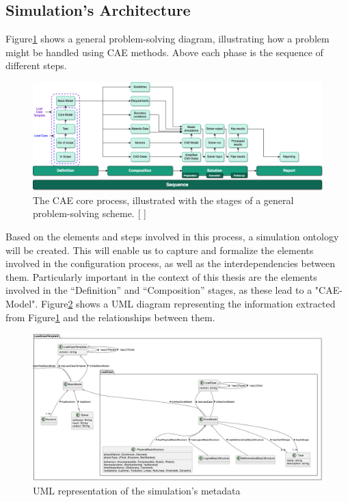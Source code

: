 \subsection{Simulation's Architecture}
Figure\ref{fig:cea-proc} shows a general problem-solving diagram, illustrating how a problem might be handled using CAE methods. Above each phase is the sequence of different steps.\\

\begin{figure}[h]
    \centering
    \includegraphics[width=\textwidth]{images/Concept-cae-process.drawio.png}
    \caption{\label{fig:cea-proc}  The CAE core process, illustrated with the stages of a general problem-solving scheme. [ ]}
\end{figure}

Based on the elements and steps involved in this process, a simulation ontology will be created. This will enable us to capture and formalize the elements involved in the configuration process, as well as the interdependencies between them. Particularly important in the context of this thesis are the elements involved in the “Definition” and “Composition” stages, as these lead to a "CAE-Model". Figure\ref{fig:uml-sim} shows a UML diagram representing the information extracted from Figure\ref{fig:cea-proc} and the relationships between them.\\

\begin{figure}[h]
    \centering
    \includegraphics[width=\textwidth]{images/UML-Sim.png}
    \caption{\label{fig:uml-sim}  UML representation of the simulation’s metadata}
\end{figure}


